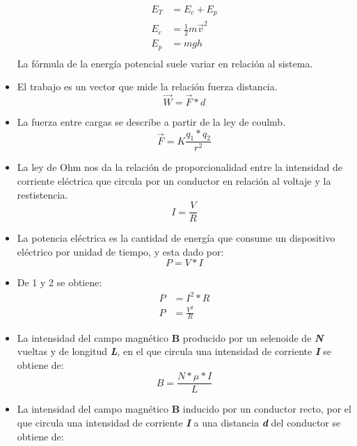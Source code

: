 \documentclass[letterpaper,global 12pt]{article}
\begin{document}
\begin{itemize}
    \begin{align*}
        E_T&=E_c+E_p\\
        E_c&=\frac{1}{2}m\Vec{v}^2\\
        E_p&=mgh\\
    \end{align*}
    La fórmula de la energía potencial suele variar en relación al sistema. 
    \item[\spadesuit] El trabajo es un vector que mide la relación fuerza distancia.
    \begin{equation*}
        \Vec{W}=\Vec{F}*d
    \end{equation*}
    \item[\dagger] La fuerza entre cargas se describe a partir de la ley de coulmb.
    \begin{equation*}
        \Vec{F}=K\frac{q_1*q_2}{r^2}
    \end{equation*}
    \item[\Re]La ley de Ohm nos da la relación de proporcionalidad entre la intensidad de corriente eléctrica que circula por un conductor en relación al voltaje y la restistencia. 
    \begin{equation}
        I=\frac{V}{R}
    \end{equation}
    \item[\aleph]La potencia eléctrica es la cantidad de energía que consume un dispositivo eléctrico por unidad de tiempo, y esta dado por:
    \begin{equation}
        P=V*I
    \end{equation}
    \item[\Im] De 1 y 2 se obtiene:
    \begin{align*}
        P&=I^2*R\\
        P&=\frac{V^2}{R}
    \end{align*}
    \item[\diamondsuit]La intensidad del campo magnético \textbf{B} producido por un selenoide de \textbf{\textit{N}} vueltas y de longitud \textbf{\textit{L}}, en el que circula una intensidad de corriente \textbf{\textit{I}} se obtiene de:
    \begin{equation*}
        B=\frac{N*\mu*I}{L}
    \end{equation*}
    \item[\vdash]La intensidad del campo magnético \textbf{B} inducido por un conductor recto, por el que circula una intensidad de corriente \textbf{\textit{I}} a una distancia \textbf{\textit{d}} del conductor se obtiene de:

\end{itemize}
\end{document}
